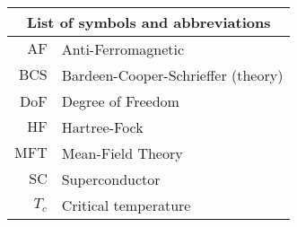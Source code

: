 
	\thispagestyle{plain}
	\begin{table}
		\centering
		\begin{tabular}{r l}
			\multicolumn{2}{c}{\textbf{List of symbols and abbreviations}} \\
			\midrule
			$\mathrm{AF}$ & Anti-Ferromagnetic \\
			$\mathrm{BCS}$ & Bardeen-Cooper-Schrieffer (theory) \\
			DoF & Degree of Freedom \\
			$\mathrm{HF}$ & Hartree-Fock \\
			$\mathrm{MFT}$ & Mean-Field Theory \\
			$\mathrm{SC}$ & Superconductor \\
			$T_c$ & Critical temperature \\
		\end{tabular}
	\end{table}
\restoregeometry 

